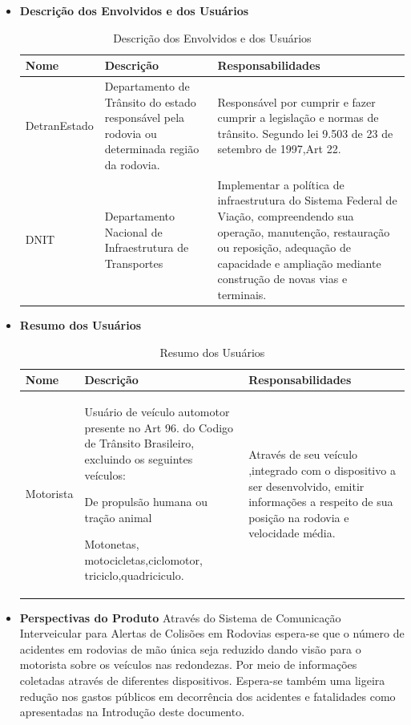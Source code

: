\begin{itemize}
\item \textbf{Descrição dos Envolvidos e dos Usuários}

\begin{table}[h!]
\caption{Descrição dos Envolvidos e dos Usuários}
\centering
\begin{tabular}{| p{3cm} |  p{5cm} | p{5cm} |}
\hline
Nome & Descrição & Responsabilidades \\
\hline
DetranEstado & Departamento de Trânsito do estado responsável pela rodovia ou determinada região da rodovia. & Responsável por cumprir e fazer cumprir a legislação e normas de trânsito. Segundo lei 9.503 de 23 de setembro de 1997,Art 22. \\
\hline
DNIT & Departamento Nacional de Infraestrutura de Transportes & Implementar a política de infraestrutura do Sistema Federal de Viação, compreendendo sua operação, manutenção, restauração ou reposição, adequação de capacidade e ampliação mediante construção de novas vias e terminais. \\
\hline
\end{tabular}
\end{table}


\item \textbf{Resumo dos Usuários}

\begin{table}[h!]
\caption{Resumo dos Usuários}
\centering
\begin{tabular}{| p{3cm} |  p{5cm} | p{5cm} |}
\hline
Nome & Descrição & Responsabilidades \\
\hline
Motorista & Usuário de veículo automotor presente no Art 96. do Codigo de Trânsito Brasileiro, excluindo os seguintes veículos:

De propulsão humana ou tração animal

Motonetas, motocicletas,ciclomotor, triciclo,quadriciculo. & Através de seu veículo ,integrado com o dispositivo a ser desenvolvido, emitir informações a respeito de sua posição na rodovia e velocidade média.
 \\
\hline
\end{tabular}
\end{table}

\item \textbf{Perspectivas do Produto}
Através do Sistema de Comunicação Interveicular para Alertas de Colisões em Rodovias espera-se que o número de acidentes em rodovias de mão única seja reduzido dando visão para o motorista sobre os veículos nas redondezas. Por meio de informações coletadas através de diferentes dispositivos. Espera-se também uma ligeira redução nos gastos públicos em decorrência dos acidentes e fatalidades como apresentadas na Introdução deste documento.


\end{itemize}
